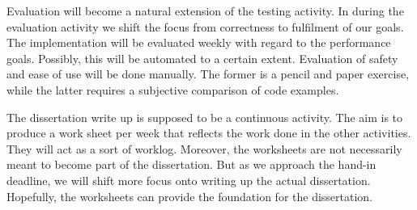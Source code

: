 \documentclass[preprint,10pt,numbers]{sigplanconf}
\begin{document}
Evaluation will become a natural extension of the testing activity. In during the evaluation activity we shift the focus from correctness to fulfilment of our goals. The implementation will be evaluated weekly with regard to the performance goals. Possibly, this will be automated to a certain extent. Evaluation of safety and ease of use will be done manually. The former is a pencil and paper exercise, while the latter requires a subjective comparison of code examples.

The dissertation write up is supposed to be a continuous activity. The aim is to produce a work sheet per week that reflects the work done in the other activities. They will act as a sort of worklog. Moreover, the worksheets are not necessarily meant to become part of the dissertation. But as we approach the hand-in deadline, we will shift more focus onto writing up the actual dissertation. Hopefully, the worksheets can provide the foundation for the dissertation.


\softraggedright

\end{document}
